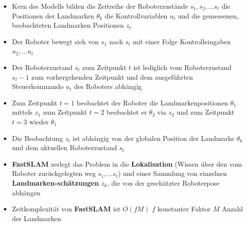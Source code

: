 \begin{itemize}
	\item Kern des Modells bilden die
	\subitem Zeitreihe der Roboterzustände $s_1, s_2, ... s_t$
	\subitem die Positionen der Landmarken $\theta_k$
	\subitem die Kontrollvariablen $u_t$
	\subitem und die gemessenen, beobachteten Landmarken Positionen $z_t$
	\item Der Roboter bewegt sich von $s_1$ nach $s_t$ mit einer Folge Kontrolleingaben $u_2, ... u_t$
	\item Der Roboterzustand $s_t$ zum Zeitpunkt $t$ ist lediglich vom Roboterzustand $s_t-1$ zum vorhergehenden Zeitpunkt und dem ausgeführten Steuerkommando $u_t$ des Roboters abhängig
	\item Zum Zeitpunkt $t = 1$ beobachtet der Roboter die Landmarkenpositionen $\theta_1$ mittels $z_1$ zum Zeitpunkt $t = 2$ beobachtet er $\theta_2$ via $z_2$ und zum Zeitpunkt $t = 3$ wieder $\theta_1$
	\item Die Beobachtung $z_t$ ist abhängig von der globalen Position der Landmarke $\theta_k$ und dem aktuellen Roboterzustand $s_t$
	\item \textbf{FastSLAM} zerlegt das Problem
	\subitem in die \textbf{Lokalisation} (Wissen über den vom Roboter zurückgelegten weg  $s_1, ... s_t$)
	\subitem und einer Sammlung von einzelnen \textbf{Landmarken-schätzungen} $z_k$, die von der geschätzter Roboterpose abhängen
	\item Zeitkomplexität von \textbf{FastSLAM} ist $O(f M)$
	\subitem $f$ konstanter Faktor
	\subitem $M$ Anzahl der Landmarken
\end{itemize}





















